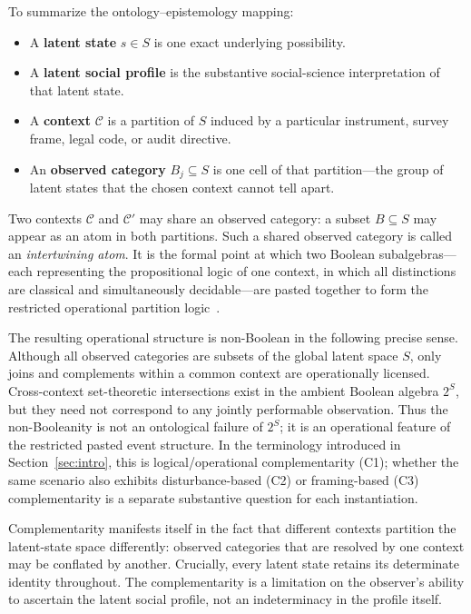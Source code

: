 \documentclass[aps,pra,twocolumn,superscriptaddress,floatfix,longbibliography]{revtex4-2}
\begin{document}
To summarize the ontology--epistemology mapping:
\begin{itemize}
\item A \textbf{latent state} $s \in S$ is one exact underlying
  possibility.
\item A \textbf{latent social profile} is the substantive
  social-science interpretation of that latent state.
\item A \textbf{context} $\mathcal{C}$ is a partition of $S$
  induced by a particular instrument, survey frame, legal code,
  or audit directive.
\item An \textbf{observed category} $B_j \subseteq S$ is one cell
  of that partition---the group of latent states that the chosen
  context cannot tell apart.
\end{itemize}

Two contexts $\mathcal{C}$ and $\mathcal{C}'$ may share an observed
category: a subset $B \subseteq S$ may appear as an atom in both
partitions. Such a shared observed category is called an
\emph{intertwining atom}. It is the formal point at which two
Boolean subalgebras---each representing the propositional logic of
one context, in which all distinctions are classical and
simultaneously decidable---are pasted together to form the restricted
operational partition logic~\cite{greechie-1974,wright:pent,
svozil-2018-b}.

The resulting operational structure is non-Boolean in the following
precise sense. Although all observed categories are subsets of the
global latent space $S$, only joins and complements within a common
context are operationally licensed. Cross-context set-theoretic
intersections exist in the ambient Boolean algebra $2^S$, but they
need not correspond to any jointly performable observation. Thus the
non-Booleanity is not an ontological failure of $2^S$; it is an
operational feature of the restricted pasted event structure. In
the terminology introduced in Section~\ref{sec:intro}, this is
logical/operational complementarity (C1); whether the same scenario
also exhibits disturbance-based (C2) or framing-based (C3)
complementarity is a separate substantive question for each
instantiation.

Complementarity manifests itself in the fact that different contexts
partition the latent-state space differently: observed categories
that are resolved by one context may be conflated by another.
Crucially, every latent state retains its determinate identity
throughout. The complementarity is a limitation on the observer's
ability to ascertain the latent social profile, not an indeterminacy
in the profile itself.
\end{document}
